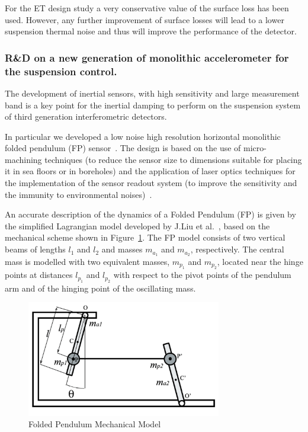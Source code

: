 For the ET design study a very conservative value of the surface loss has been used. However, any further improvement of surface losses will lead to a lower suspension thermal noise and thus will improve the performance of the detector.



\FloatBarrier
\subsubsection{R\&D on a new generation of monolithic accelerometer for the suspension control.}
\label{sec:accelerometers}

The development of inertial sensors, with high sensitivity and large measurement band is a key point for the inertial damping to perform on the suspension system of third generation interferometric detectors.

In particular we developed a low noise high resolution horizontal monolithic folded pendulum (FP) sensor~\cite{BLAIR-1,FIDECARO-1}. The design is based on the use of micro-machining techniques (to reduce the sensor size to dimensions suitable for placing it in sea floors or in boreholes) and the application of laser optics techniques for the implementation of the sensor readout system (to improve the sensitivity and the  immunity to environmental noises)~\cite{SMART10-1,RSI-1}.

\medskip


An accurate description of the dynamics of a Folded Pendulum (FP)  is given by the simplified Lagrangian model developed by J.Liu et al.~\cite{BLAIR-1}, based on the mechanical scheme shown in Figure~\ref{fig:FP_Scheme}. The FP model consists of two  vertical beams of lengths $l_1$ and $l_2$ and masses $m_{a_1}$ and $m_{a_2}$, respectively. The central mass is modelled with two equivalent masses, $m_{p_1}$ and $m_{p_2}$, located near the hinge points at distances $l_{p_1}$ and $l_{p_2}$ with respect to the pivot points of the pendulum arm and of the hinging point of the oscillating mass.
\begin{figure}[h!t]
	\centering
  	\includegraphics[width=8.5cm]{Sec_Suspensions/Figures/FP_Scheme.pdf}
	\caption{\label{fig:FP_Scheme}Folded Pendulum Mechanical Model}
\end{figure}

